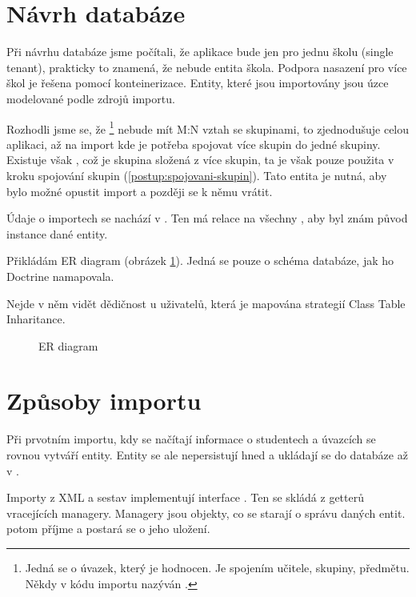 \section{Návrh databáze}

Při návrhu databáze jsme počítali, že aplikace bude jen pro jednu školu (single tenant), prakticky to znamená, že nebude entita škola. 
Podpora nasazení pro více škol je řešena pomocí konteinerizace.
Entity, které jsou importovány jsou úzce modelované podle zdrojů importu.

Rozhodli jsme se, že \footnote{Jedná se o úvazek, který je hodnocen. Je spojením učitele, skupiny, předmětu. Někdy v kódu importu nazýván .} 
nebude mít M:N vztah se skupinami, to zjednodušuje celou aplikaci, až na import kde je potřeba spojovat více skupin do jedné skupiny.
Existuje však , což je skupina složená z více skupin, ta je však pouze použita v kroku spojování skupin (\ref{postup:spojovani-skupin}).
Tato entita je nutná, aby bylo možné opustit import a později se k němu vrátit.

Údaje o importech se nachází v . Ten má relace na všechny , aby byl znám původ instance dané entity.

Přikládám ER diagram (obrázek \ref{postup:er-diagram}). Jedná se pouze o schéma databáze, jak ho Doctrine namapovala.

Nejde v něm vidět dědičnost u uživatelů, která je mapována strategií Class Table Inharitance\cite{P-of-EAA}.





\begin{figure}
	\centering
  \resizebox{0.95\textwidth}{!}{\huge{}}
  \caption{ER diagram}
  \label{postup:er-diagram}
\end{figure}


\section{Způsoby importu}
Při prvotním importu, kdy se načítají informace o studentech a úvazcích se rovnou vytváří entity. Entity se ale nepersistují hned a ukládají se do databáze až v .

Importy z XML a sestav implementují interface . Ten se skládá z getterů vracejících managery. Managery jsou objekty, co se starají o správu daných entit.  potom příjme  a postará se o jeho uložení. 

